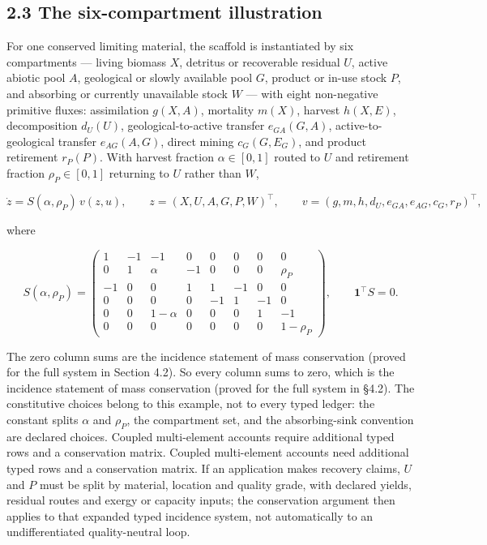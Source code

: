 \documentclass[11pt]{article}
\begin{document}
\subsection*{2.3 The six-compartment illustration}\label{23-the-six-compartment-illustration}

For one conserved limiting material, the scaffold is instantiated by six compartments --- living biomass \(X\), detritus or recoverable residual \(U\), active abiotic pool \(A\), geological or slowly available pool \(G\), product or in-use stock \(P\), and absorbing or currently unavailable stock \(W\) --- with eight non-negative primitive fluxes: assimilation \(g(X,A)\), mortality \(m(X)\), harvest \(h(X,E)\), decomposition \(d_U(U)\), geological-to-active transfer \(e_{GA}(G,A)\), active-to-geological transfer \(e_{AG}(A,G)\), direct mining \(c_G(G,E_G)\), and product retirement \(r_P(P)\). With harvest fraction \(\alpha \in [0,1]\) routed to \(U\) and retirement fraction \(\rho_P \in [0,1]\) returning to \(U\) rather than \(W\), 

$$\dot z = S(\alpha, \rho_P)\, v(z, u), \qquad z = (X, U, A, G, P, W)^\top, \qquad v = (g, m, h, d_U, e_{GA}, e_{AG}, c_G, r_P)^\top,$$

 where 

$$S(\alpha, \rho_P) = \begin{pmatrix} 1 & -1 & -1 & 0 & 0 & 0 & 0 & 0 \\ 0 & 1 & \alpha & -1 & 0 & 0 & 0 & \rho_P \\ -1 & 0 & 0 & 1 & 1 & -1 & 0 & 0 \\ 0 & 0 & 0 & 0 & -1 & 1 & -1 & 0 \\ 0 & 0 & 1-\alpha & 0 & 0 & 0 & 1 & -1 \\ 0 & 0 & 0 & 0 & 0 & 0 & 0 & 1-\rho_P \end{pmatrix}, \qquad \mathbf{1}^\top S = 0.$$

 The zero column sums are the incidence statement of mass conservation (proved for the full system in Section 4.2). So every column sums to zero, which is the incidence statement of mass conservation (proved for the full system in \S4.2). The constitutive choices belong to this example, not to every typed ledger: the constant splits \(\alpha\) and \(\rho_P\), the compartment set, and the absorbing-sink convention are declared choices. Coupled multi-element accounts require additional typed rows and a conservation matrix. Coupled multi-element accounts need additional typed rows and a conservation matrix. If an application makes recovery claims, \(U\) and \(P\) must be split by material, location and quality grade, with declared yields, residual routes and exergy or capacity inputs; the conservation argument then applies to that expanded typed incidence system, not automatically to an undifferentiated quality-neutral loop.
\end{document}
